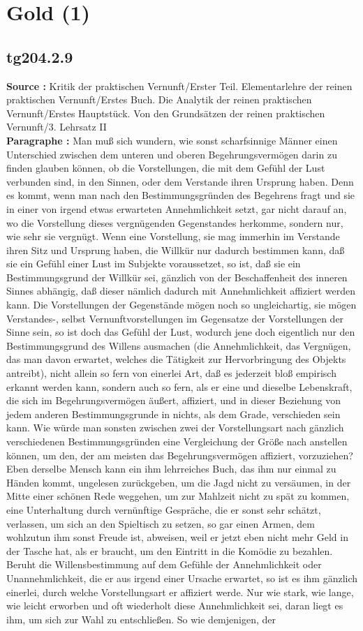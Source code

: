 \documentclass[a4paper,12pt,twoside]{book}
\newcommand{\unnumberedsection}[1]{
	\section*{#1}
	\addcontentsline{toc}{section}{#1}
	\markright{#1}
}
\begin{document}
	\unnumberedsection{Gold (1)} 
	\subsection*{tg204.2.9} 
	\textbf{Source : }Kritik der praktischen Vernunft/Erster Teil. Elementarlehre der reinen praktischen Vernunft/Erstes Buch. Die Analytik der reinen praktischen Vernunft/Erstes Hauptstück. Von den Grundsätzen der reinen praktischen Vernunft/3. Lehrsatz II\\  
	
	\noindent\textbf{Paragraphe : }Man muß sich wundern, wie sonst scharfsinnige Männer einen Unterschied zwischen dem unteren und oberen Begehrungsvermögen darin zu finden glauben können, ob die Vorstellungen, die mit dem Gefühl der Lust verbunden sind, in den Sinnen, oder dem Verstande ihren Ursprung haben. Denn es kommt, wenn man nach den Bestimmungsgründen des Begehrens fragt und sie in einer von irgend etwas erwarteten Annehmlichkeit setzt, gar nicht darauf an, wo die Vorstellung dieses vergnügenden Gegenstandes herkomme, sondern nur, wie sehr sie vergnügt. Wenn eine Vorstellung, sie mag immerhin im Verstande ihren Sitz und Ursprung haben, die Willkür nur dadurch bestimmen  kann, daß sie ein Gefühl einer Lust im Subjekte voraussetzet, so ist, daß sie ein Bestimmungsgrund der Willkür sei, gänzlich von der Beschaffenheit des inneren Sinnes abhängig, daß dieser nämlich dadurch mit Annehmlichkeit affiziert werden kann. Die Vorstellungen der Gegenstände mögen noch so ungleichartig, sie mögen Verstandes-, selbst Vernunftvorstellungen im Gegensatze der Vorstellungen der Sinne sein, so ist doch das Gefühl der Lust, wodurch jene doch eigentlich nur den Bestimmungsgrund des Willens ausmachen (die Annehmlichkeit, das Vergnügen, das man davon erwartet, welches die Tätigkeit zur Hervorbringung des Objekts antreibt), nicht allein so fern von einerlei Art, daß es jederzeit bloß empirisch erkannt werden kann, sondern auch so fern, als er eine und dieselbe Lebenskraft, die sich im Begehrungsvermögen äußert, affiziert, und in dieser Beziehung von jedem anderen Bestimmungsgrunde in nichts, als dem Grade, verschieden sein kann. Wie würde man sonsten zwischen zwei der Vorstellungsart nach gänzlich verschiedenen Bestimmungsgründen eine Vergleichung der Größe nach anstellen können, um den, der am meisten das Begehrungsvermögen affiziert, vorzuziehen? Eben derselbe Mensch kann ein ihm lehrreiches Buch, das ihm nur einmal zu Händen kommt, ungelesen zurückgeben, um die Jagd nicht zu versäumen, in der Mitte einer schönen Rede weggehen, um zur Mahlzeit nicht zu spät zu kommen, eine Unterhaltung durch vernünftige Gespräche, die er sonst sehr schätzt, verlassen, um sich an den Spieltisch zu setzen, so gar einen Armen, dem wohlzutun ihm sonst Freude ist, abweisen, weil er jetzt eben nicht mehr Geld in der Tasche hat, als er braucht, um den Eintritt in die Komödie zu bezahlen. Beruht die Willensbestimmung auf dem Gefühle der Annehmlichkeit oder Unannehmlichkeit, die er aus irgend einer Ursache erwartet, so ist es ihm gänzlich einerlei, durch welche Vorstellungsart er affiziert werde. Nur wie stark, wie lange, wie leicht erworben und oft wiederholt diese Annehmlichkeit sei, daran liegt es ihm, um sich zur Wahl zu entschließen. So wie demjenigen, der 
\end{document}
